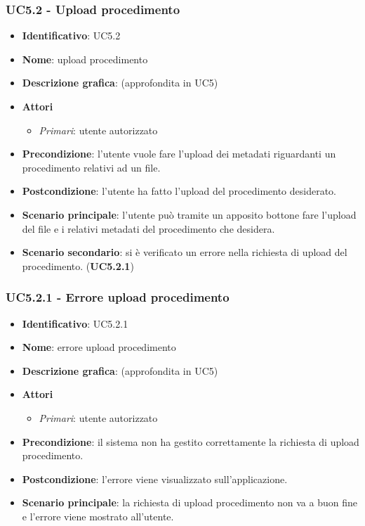 \subsubsection{UC5.2 - Upload procedimento}
\begin{itemize}
  \item \textbf{Identificativo}: UC5.2
  \item \textbf{Nome}: upload procedimento
  \item \textbf{Descrizione grafica}: (approfondita in UC5)
  \item \textbf{Attori}
        \begin{itemize}
          \item \textit{Primari}: utente autorizzato
        \end{itemize}
  \item \textbf{Precondizione}: l'utente vuole fare l'upload dei metadati riguardanti un procedimento relativi ad un file.
  \item \textbf{Postcondizione}: l'utente ha fatto l'upload del procedimento desiderato.
  \item \textbf{Scenario principale}: l'utente può tramite un apposito bottone fare l'upload del file e i relativi metadati del procedimento che desidera.
  \item \textbf{Scenario secondario}: si è verificato un errore nella richiesta di upload del procedimento. (\textbf{UC5.2.1})
\end{itemize}

\subsubsection{UC5.2.1 - Errore upload procedimento}
\begin{itemize}
  \item \textbf{Identificativo}: UC5.2.1
  \item \textbf{Nome}: errore upload procedimento
  \item \textbf{Descrizione grafica}: (approfondita in UC5)
  \item \textbf{Attori}
        \begin{itemize}
          \item \textit{Primari}: utente autorizzato
        \end{itemize}
  \item \textbf{Precondizione}: il sistema non ha gestito correttamente la richiesta di upload procedimento.
  \item \textbf{Postcondizione}: l'errore viene visualizzato sull'applicazione.
  \item \textbf{Scenario principale}: la richiesta di upload procedimento non va a buon fine e l'errore viene mostrato all'utente.
\end{itemize}


